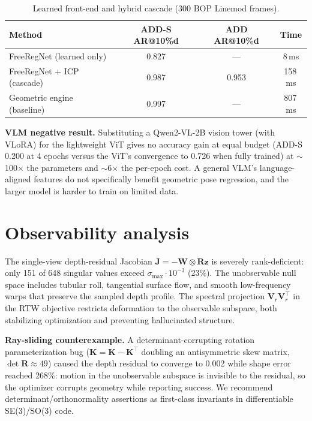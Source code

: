 \documentclass[10pt]{article}
\begin{document}
\begin{table}[h]
\centering
\caption{Learned front-end and hybrid cascade (300 BOP Linemod frames).}
\label{tab:frnres}
\begin{tabular}{lccc}
\toprule
Method & ADD-S AR@10\%d & ADD AR@10\%d & Time \\
\midrule
FreeRegNet (learned only) & 0.827 & --- & 8\,ms \\
FreeRegNet + ICP (cascade) & 0.987 & 0.953 & 158\,ms \\
Geometric engine (baseline) & 0.997 & --- & 807\,ms \\
\bottomrule
\end{tabular}
\end{table}

\textbf{VLM negative result.} Substituting a Qwen2-VL-2B vision tower (with
VLoRA) for the lightweight ViT gives no accuracy gain at equal budget (ADD-S
0.200 at 4 epochs versus the ViT's convergence to 0.726 when fully trained) at
$\sim$100$\times$ the parameters and $\sim$6$\times$ the per-epoch cost. A
general VLM's language-aligned features do not specifically benefit geometric
pose regression, and the larger model is harder to train on limited data.

\section{Observability analysis}
The single-view depth-residual Jacobian $\mathbf{J}=-\mathbf{W}\otimes\mathbf{R}\mathbf{z}$
is severely rank-deficient: only 151 of 648 singular values exceed
$\sigma_{\max}\cdot10^{-3}$ (23\%). The unobservable null space includes tubular
roll, tangential surface flow, and smooth low-frequency warps that preserve the
sampled depth profile. The spectral projection $\mathbf{V}_{r}\mathbf{V}_{r}^{\top}$
in the RTW objective restricts deformation to the observable subspace, both
stabilizing optimization and preventing hallucinated structure.

\textbf{Ray-sliding counterexample.} A determinant-corrupting rotation
parameterization bug ($\mathbf{K}=\mathbf{K}-\mathbf{K}^{\top}$ doubling an
antisymmetric skew matrix, $\det\mathbf{R}\approx49$) caused the depth residual
to converge to 0.002 while shape error reached 268\%: motion in the
unobservable subspace is invisible to the residual, so the optimizer corrupts
geometry while reporting success. We recommend determinant/orthonormality
assertions as first-class invariants in differentiable SE(3)/SO(3) code.
\end{document}

